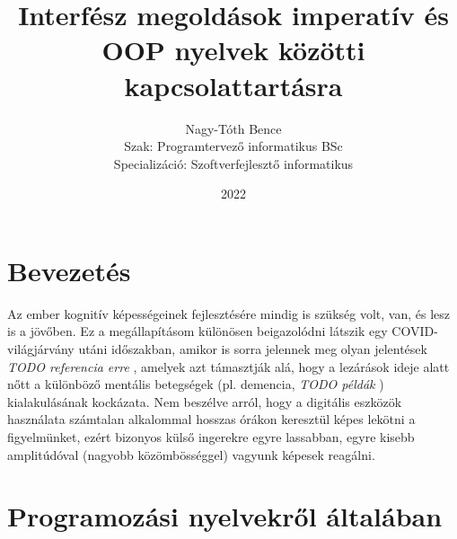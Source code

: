\documentclass[tocnopagenum]{thesis-ekf}
\theoremstyle{definition}
\theoremstyle{remark}
\begin{document}
	\title{Interfész megoldások imperatív és OOP nyelvek közötti kapcsolattartásra}
	\author{Nagy-Tóth Bence\\Szak: Programtervező informatikus BSc\\Specializáció: Szoftverfejlesztő informatikus}
	\date{2022}
	\maketitle
	\tableofcontents
	
	\chapter*{Bevezetés}
	Az ember kognitív képességeinek fejlesztésére mindig is szükség volt, van, és lesz is a jövőben. Ez a megállapításom különösen beigazolódni látszik egy COVID-világjárvány utáni időszakban, amikor is sorra jelennek meg olyan jelentések \emph{TODO referencia erre} \cite{brain1}
	, amelyek azt támasztják alá, hogy a lezárások ideje alatt nőtt a különböző mentális betegségek (pl. demencia, \emph{TODO példák}
	) kialakulásának kockázata. Nem beszélve arról, hogy a digitális eszközök használata számtalan alkalommal hosszas órákon keresztül képes lekötni a figyelmünket, ezért bizonyos külső ingerekre egyre lassabban, egyre kisebb amplitúdóval (nagyobb közömbösséggel) vagyunk képesek reagálni.
	\chapter{Programozási nyelvekről általában}
\end{document}
